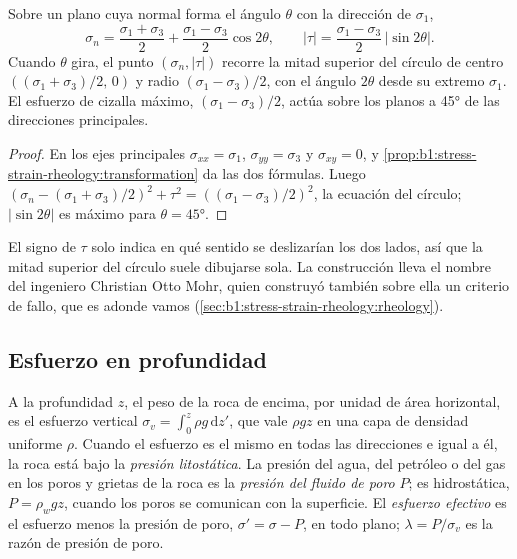\begin{proposition}\label{prop:b1:stress-strain-rheology:mohr}
Sobre un plano cuya normal forma el ángulo $\theta$ con la dirección de $\sigma_1$,
\[
  \sigma_n = \frac{\sigma_1+\sigma_3}{2} + \frac{\sigma_1-\sigma_3}{2}\cos2\theta,
  \qquad
  |\tau| = \frac{\sigma_1-\sigma_3}{2}\,|\sin2\theta| .
\]
Cuando $\theta$ gira, el punto $(\sigma_n, |\tau|)$ recorre la mitad superior del círculo de centro $((\sigma_1+\sigma_3)/2,\, 0)$ y radio $(\sigma_1-\sigma_3)/2$,
con el ángulo $2\theta$ desde su extremo $\sigma_1$. El esfuerzo de cizalla máximo, $(\sigma_1-\sigma_3)/2$, actúa sobre los planos a \ang{45} de las direcciones principales.
\end{proposition}

\begin{proof}
En los ejes principales $\sigma_{xx} = \sigma_1$, $\sigma_{yy} = \sigma_3$ y $\sigma_{xy} = 0$, y \cref{prop:b1:stress-strain-rheology:transformation} da las dos fórmulas.
Luego $(\sigma_n - (\sigma_1+\sigma_3)/2)^2 + \tau^2 = ((\sigma_1-\sigma_3)/2)^2$, la ecuación del círculo; $|\sin2\theta|$ es máximo para $\theta = \ang{45}$.
\end{proof}

El signo de $\tau$ solo indica en qué sentido se deslizarían los dos lados, así que la mitad superior del círculo suele dibujarse sola. La
construcción lleva el nombre del ingeniero Christian Otto Mohr, quien construyó también sobre ella un criterio de fallo, que es adonde vamos
(\cref{sec:b1:stress-strain-rheology:rheology}).

\subsection*{Esfuerzo en profundidad}

\begin{definition}\label{def:b1:stress-strain-rheology:lithostatic}
A la profundidad $z$, el peso de la roca de encima, por unidad de área horizontal, es el esfuerzo vertical $\sigma_v = \int_0^z\rho g\,\mathrm dz'$,
que vale $\rho g z$ en una capa de densidad uniforme $\rho$. Cuando el esfuerzo es el mismo en todas las direcciones e igual a él, la roca está bajo la
\emph{presión litostática}. La presión del agua, del petróleo o del gas en los poros y grietas de la roca es la \emph{presión del
fluido de poro} $P$; es hidrostática, $P = \rho_w g z$, cuando los poros se comunican con la superficie. El
\emph{esfuerzo efectivo} es el esfuerzo menos la presión de poro, $\sigma' = \sigma - P$, en todo plano; $\lambda = P/\sigma_v$ es la
razón de presión de poro.
\end{definition}

